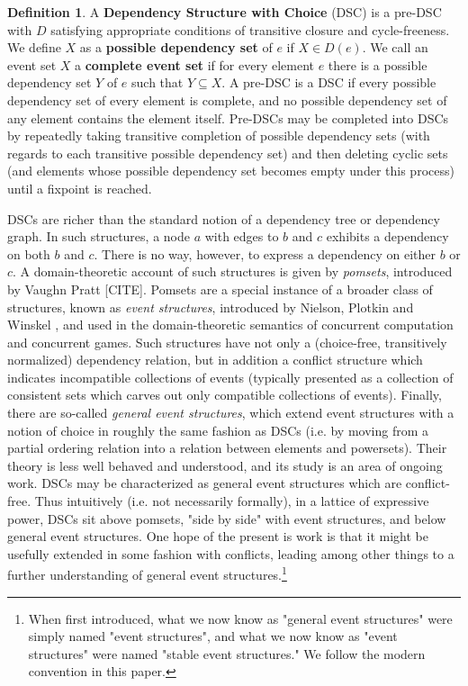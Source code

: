 \documentclass[hoptionsi,review,format=acmsmall]{acmart}
\theoremstyle{definition}
\newtheorem{definition}{Definition}[section]
\begin{document}
\begin{definition}
A \textbf{Dependency Structure with Choice} (DSC) is a pre-DSC with \(D\) satisfying  appropriate conditions of transitive closure and cycle-freeness. We define \(X\) as a \textbf{possible dependency set} of \(e\) if \(X \in D(e)\). We call an event set \(X\) a \textbf{complete event set} if for every element \(e\) there is a possible dependency set \(Y\) of \(e\) such that \(Y \subseteq X\). A pre-DSC is a DSC if every possible dependency set of every element is complete, and no possible dependency set of any element contains the element itself. Pre-DSCs may be completed into DSCs by repeatedly taking transitive completion of possible dependency sets (with regards to each transitive possible dependency set) and then deleting cyclic sets (and elements whose possible dependency set becomes empty under this process) until a fixpoint is reached.
\end{definition}

DSCs are richer than the standard notion of a dependency tree or dependency graph. In such structures, a node \(a\) with edges to \(b\) and \(c\) exhibits a dependency on both \(b\) and \(c\). There is no way, however, to express a dependency on either \(b\) or \(c\). A domain-theoretic account of such structures is given by \textit{pomsets}, introduced by Vaughn Pratt [CITE]. Pomsets are a special instance of a broader class of structures, known as \textit{event structures}, introduced by Nielson, Plotkin and Winskel \cite{nielsen1981petri}, and used in the domain-theoretic semantics of concurrent computation and concurrent games. Such structures have not only a (choice-free, transitively normalized) dependency relation, but in addition a conflict structure which indicates incompatible collections of events (typically presented as a collection of consistent sets which carves out only compatible collections of events). Finally, there are so-called \textit{general event structures}, which extend event structures with a notion of choice in roughly the same fashion as DSCs (i.e. by moving from a partial ordering relation into a relation between elements and powersets). Their theory is less well behaved and understood, and its study is an area of ongoing work. DSCs may be characterized as general event structures which are conflict-free. Thus intuitively (i.e. not necessarily formally), in a lattice of expressive power, DSCs sit above pomsets, "side by side" with event structures, and below general event structures. One hope of the present is work is that it might be usefully extended in some fashion with conflicts, leading among other things to a further understanding of general event structures.\footnote{When first introduced, what we now know as "general event structures" were simply named "event structures", and what we now know as "event structures" were named "stable event structures." We follow the modern convention in this paper.}
\end{document}
